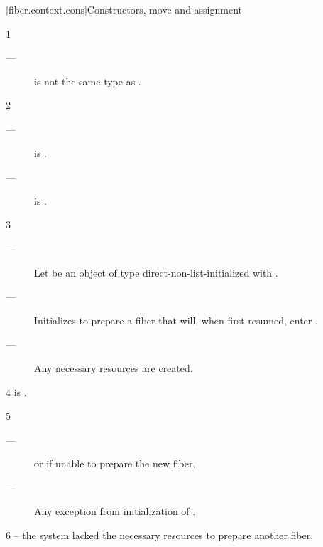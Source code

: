 
\newcommand{\state}{\cpp{state}}

[fiber.context.cons]{Constructors, move and assignment}


1 \constraints
\begin{description}
    \item[---]  is not the same type as \fiber.
\end{description}

2 \mandates
\begin{description}
    \item[---]  is \true.
    \item[---]  is \true.
\end{description}

3 \effects
\begin{description}
    \item[---] Let  be an object of
               type  direct-non-list-initialized
               with . 
    \item[---] Initializes  to prepare a fiber that will, when
               first resumed, enter .
    \item[---] Any necessary resources are created. 
\end{description}

4 \postcond
\emptyfn is \false.

5 \except
\begin{description}
    \item[---]  or  if unable to prepare the new fiber.
    \item[---] Any exception from initialization of .
\end{description}

6 \errors
{} -- the system lacked the necessary resources to prepare another fiber.

